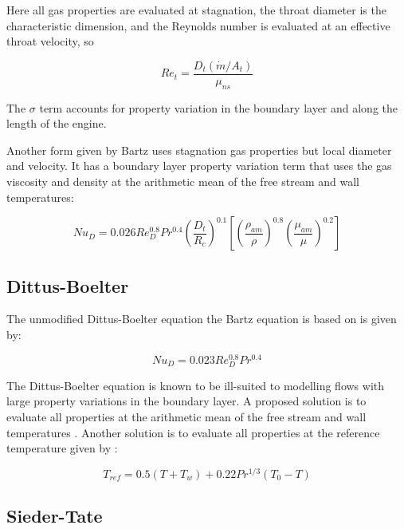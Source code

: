 \documentclass[11pt]{article}
\begin{document}
Here all gas properties are evaluated at stagnation, the throat diameter is the characteristic dimension, and the Reynolds number is evaluated at an effective throat velocity, so

\begin{equation}
  Re_{t} = \frac{D_t (\dot{m} / A_t)}{ \mu_{ns}}
\end{equation}

The $\sigma$ term accounts for property variation in the boundary layer and along the length of the engine.

Another form given by Bartz uses stagnation gas properties but local diameter and velocity. It has a boundary layer property variation term that uses the gas viscosity and density at the arithmetic mean of the free stream and wall temperatures:

\begin{equation}
  Nu_{D} = 0.026 Re_{D}^{0.8} Pr^{0.4} \left( \frac{D_t}{R_c} \right)^{0.1} \left[ \left( \frac{\rho_{am}}{\rho} \right)^{0.8} \left(\frac{\mu_{am}}{\mu} \right)^{0.2}\right]
\end{equation}


\subsection{Dittus-Boelter}

The unmodified Dittus-Boelter equation the Bartz equation is based on is given by:


\begin{equation}
  Nu_{D} = 0.023 Re_{D}^{0.8} Pr^{0.4}
\end{equation}

The Dittus-Boelter equation is known to be ill-suited to modelling flows with large property variations in the boundary layer. A proposed solution is to evaluate all properties at the arithmetic mean of the free stream and wall temperatures \cite{}. Another solution is to evaluate all properties at the reference temperature given by \cite{}:

\begin{equation}
  T_{ref} = 0.5(T + T_w) + 0.22 Pr^{1/3}(T_0 - T)
\end{equation}

\subsection{Sieder-Tate}
\end{document}
